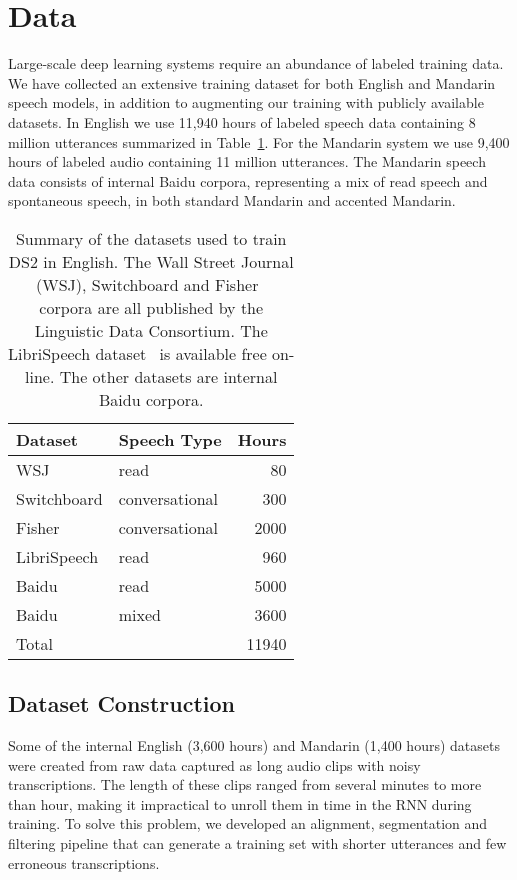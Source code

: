 \section{Data}
\label{sec:deepspeech2:data}

Large-scale deep learning systems require an abundance of labeled training
data. We have collected an extensive training dataset for both English and
Mandarin speech models, in addition to augmenting our training with publicly
available datasets. In English we use 11,940 hours of labeled speech data
containing 8 million utterances summarized in
Table~\ref{table:deepspeech2:englishdata}.  For the Mandarin system we use
9,400 hours of labeled audio containing 11 million utterances. The Mandarin
speech data consists of internal Baidu corpora, representing a mix of read
speech and spontaneous speech, in both standard Mandarin and accented Mandarin.

\begin{table}
\centering
\begin{tabular}{l l r}
 \toprule
 Dataset & Speech Type & Hours \\
 \midrule
 WSJ          & read           &   80  \\
 Switchboard  & conversational &  300  \\
 Fisher       & conversational & 2000  \\
 LibriSpeech  & read           &  960  \\
 Baidu        & read           & 5000  \\
 Baidu        & mixed          & 3600  \\
 \midrule
 Total       &                &  11940 \\
 \bottomrule
\end{tabular}
\caption{Summary of the datasets used to train DS2 in English. The Wall Street
        Journal (WSJ), Switchboard and Fisher~\cite{cieri2004fisher} corpora are
        all published by the Linguistic Data Consortium. The LibriSpeech
        dataset~\cite{panayotov2015} is available free on-line. The other datasets
        are internal Baidu corpora.}
\label{table:deepspeech2:englishdata}
\end{table}


\subsection{Dataset Construction}

Some of the internal English (3,600 hours) and Mandarin (1,400 hours) datasets
were created from raw data captured as long audio clips with noisy
transcriptions. The length of these clips ranged from several minutes to more
than hour, making it impractical to unroll them in time in the RNN during
training. To solve this problem, we developed an alignment, segmentation and
filtering pipeline that can generate a training set with shorter utterances and
few erroneous transcriptions.

